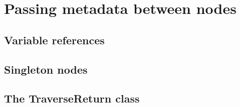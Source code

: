 \section{Passing metadata between nodes}
\subsection{Variable references}
\subsection{Singleton nodes}
\subsection{The TraverseReturn class}